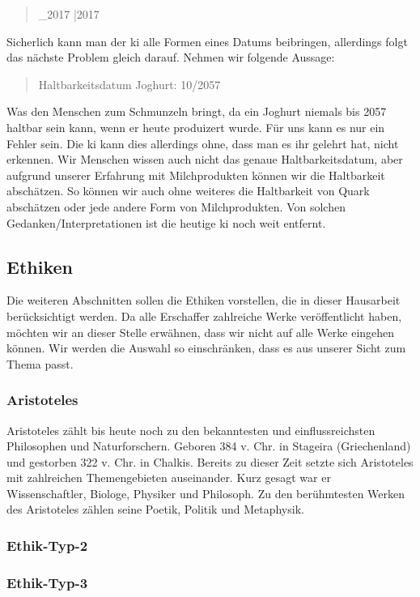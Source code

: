 \begin{quote}
		\_2017	 |2017  
\end{quote}
Sicherlich kann man der \ac{ki} alle Formen eines Datums beibringen, allerdings folgt das nächste Problem gleich darauf. Nehmen wir folgende Aussage:
\begin{quote}
	\quad Haltbarkeitsdatum Joghurt: 10/2057 
\end{quote}
Was den Menschen zum Schmunzeln bringt, da ein Joghurt niemals bis 2057 haltbar sein kann, wenn er heute produizert wurde. Für uns kann es nur ein Fehler sein. Die \ac{ki} kann dies allerdings ohne, dass man es ihr gelehrt hat, nicht erkennen. Wir Menschen wissen auch nicht das genaue Haltbarkeitsdatum, aber aufgrund unserer Erfahrung mit Milchprodukten können wir die Haltbarkeit abschätzen. So können wir auch ohne weiteres die Haltbarkeit von Quark abschätzen oder jede andere Form von Milchprodukten. Von solchen Gedanken/Interpretationen ist die heutige \ac{ki} noch weit entfernt. 

\subsection{Ethiken}
Die weiteren Abschnitten sollen die Ethiken vorstellen, die in dieser Hausarbeit berücksichtigt werden. Da alle \glqq Erschaffer\grqq{} zahlreiche Werke veröffentlicht haben, möchten wir an dieser Stelle erwähnen, dass wir nicht auf alle Werke eingehen können. Wir werden die Auswahl so einschränken, dass es aus unserer Sicht zum Thema passt. 

\subsubsection{Aristoteles}
Aristoteles zählt bis heute noch zu den bekanntesten und einflussreichsten Philosophen und Naturforschern. Geboren 384 v. Chr. in Stageira (Griechenland) und gestorben 322 v. Chr. in Chalkis. Bereits zu dieser Zeit setzte sich Aristoteles mit zahlreichen Themengebieten auseinander. Kurz gesagt war er Wissenschaftler, Biologe, Physiker und Philosoph. Zu den berühmtesten Werken des Aristoteles zählen seine Poetik, Politik und Metaphysik.

\subsubsection{Ethik-Typ-2}

\subsubsection{Ethik-Typ-3}
